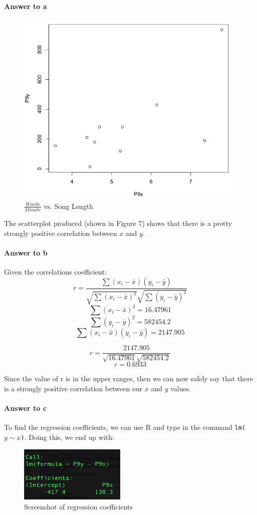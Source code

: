 \documentclass{article}
\newcommand{\code}[1]{\texttt{#1}} %
\newcommand{\p}[1]{\paragraph{#1}} %
\begin{document}
	\clearpage
	\p{Answer to a}
	\begin{figure}[!htbp]
	   \centering
	   \includegraphics[width=\textwidth]{img/Prob9a.jpg} 
	   \caption{$\frac{Words}{Minute}$ vs. Song Length}
	   \label{fig:problem9_a}
	\end{figure}
	
	The scatterplot produced (shown in Figure 7) shows that there is a pretty strongly positive 
	correlation between $x$ and $y$.
	
	\clearpage
	\p{Answer to b}
	Given the correlations coefficient:
	\[ r = \frac{\sum(x_i-\bar{x})(y_i-\bar{y})}{\sqrt{\sum(x_i-\bar{x})^2}\sqrt{\sum(y_i-\bar{y})^2}} \]
	\[ \sum(x_i-\bar{x})^2 = 16.47961 \]
	\[ \sum(y_i-\bar{y})^2 = 582454.2 \]
	\[ \sum(x_i-\bar{x})(y_i-\bar{y}) = 2147.905 \]
	
	\[ r = \frac{2147.905}{\sqrt{16.47961}\sqrt{582454.2}} \]
	\[ r = 0.6933 \]
	
	Since the value of r is in the upper ranges, then we can now safely say that there is a strongly 
	positive correlation between our $x$ and $y$ values.
	
	\p{Answer to c} %
	To find the regression coefficients, we can use R and type in the command \code{lm($y\sim x
	$)}. 
	Doing this, we end up with:
	
	\begin{figure}[!htb]
		\centering
		\includegraphics[width=2in]{img/Prob9c.jpg}
		\caption{Screenshot of regression coefficients}
		\label{fig:Problem9_c}
	\end{figure}
	
\end{document}

